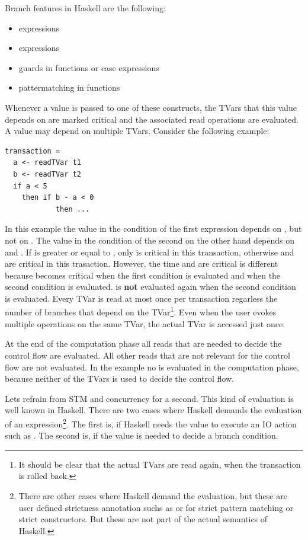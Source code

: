 Branch features in Haskell are the following:
\begin{itemize}
 \item {} expressions
 \item {} expressions
 \item guards in functions or case expressions
 \item pattermatching in functions
\end{itemize}
Whenever a value is passed to one of these constructs, the TVars that this value depends on are marked critical
and the associated read operations are evaluated.
A value may depend on multiple TVars. Consider the following example:
\begin{lstlisting}
transaction =
  a <- readTVar t1
  b <- readTVar t2
  if a < 5
    then if b - a < 0 
            then ...
\end{lstlisting}
In this example the value in the condition of the first  expression depends on , but not
on . The value in the condition of the second  on the other hand 
depends on  and . If  is greater or equal to , only  is critical
in this transaction, otherwise  and  are critical in this trasaction. However, the time 
 and  are critical is different because  becomes critical when the first  
condition is evaluated and  when the second  condition is evaluated.  is \textbf{not} 
evaluated again when the second  condition is evaluated. Every TVar is read at most once per 
transaction regarless the number of branches that depend on the TVar\footnote{It should be clear that the
actual TVars are read again, when the transaction is rolled back.}. Even when the user evokes
multiple  operations on the same TVar, the actual TVar is accessed just once. 

At the end of the computation phase all reads that are needed to decide the control flow are evaluated. 
All other reads that are not relevant for the control flow are not evaluated. 
In the  example no  is evaluated in the computation phase, because neither of the 
TVars is used to decide the control flow.

Lets refrain from STM and concurrency for a second. This kind of evaluation is well known in Haskell. There 
are two cases where Haskell demands the evaluation of an expression\footnote{There are other cases where Haskell
demand the evaluation, but these are user defined strictness annotation suchs as  or \code{!} for strict 
pattern matching or strict constructors. But these are not part of the actual semantics of Haskell.}. 
The first is, if Haskell needs the value
to execute an IO action such as . The second is, if the value is needed to decide a branch condition.

